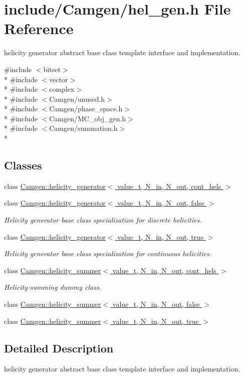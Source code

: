 \hypertarget{a00639}{\section{include/\-Camgen/hel\-\_\-gen.h File Reference}
\label{a00639}
}


helicity generator abstract base class template interface and implementation.  


{\ttfamily \#include $<$bitset$>$}\\*
{\ttfamily \#include $<$vector$>$}\\*
{\ttfamily \#include $<$complex$>$}\\*
{\ttfamily \#include $<$Camgen/unused.\-h$>$}\\*
{\ttfamily \#include $<$Camgen/phase\-\_\-space.\-h$>$}\\*
{\ttfamily \#include $<$Camgen/\-M\-C\-\_\-obj\-\_\-gen.\-h$>$}\\*
{\ttfamily \#include $<$Camgen/summation.\-h$>$}\\*
\subsection*{Classes}
\begin{DoxyCompactItemize}
\item 
class \hyperlink{a00266}{Camgen\-::helicity\-\_\-generator$<$ value\-\_\-t, N\-\_\-in, N\-\_\-out, cont\-\_\-hels $>$}
\item 
class \hyperlink{a00267}{Camgen\-::helicity\-\_\-generator$<$ value\-\_\-t, N\-\_\-in, N\-\_\-out, false $>$}
\begin{DoxyCompactList}\small\item\em Helicity generator base class specialization for discrete helicities. \end{DoxyCompactList}\item 
class \hyperlink{a00268}{Camgen\-::helicity\-\_\-generator$<$ value\-\_\-t, N\-\_\-in, N\-\_\-out, true $>$}
\begin{DoxyCompactList}\small\item\em Helicity generator base class specialization for continuous helicities. \end{DoxyCompactList}\item 
class \hyperlink{a00275}{Camgen\-::helicity\-\_\-summer$<$ value\-\_\-t, N\-\_\-in, N\-\_\-out, cont\-\_\-hels $>$}
\begin{DoxyCompactList}\small\item\em Helicity-\/summing dummy class. \end{DoxyCompactList}\item 
class \hyperlink{a00276}{Camgen\-::helicity\-\_\-summer$<$ value\-\_\-t, N\-\_\-in, N\-\_\-out, false $>$}
\item 
class \hyperlink{a00277}{Camgen\-::helicity\-\_\-summer$<$ value\-\_\-t, N\-\_\-in, N\-\_\-out, true $>$}
\end{DoxyCompactItemize}


\subsection{Detailed Description}
helicity generator abstract base class template interface and implementation. 